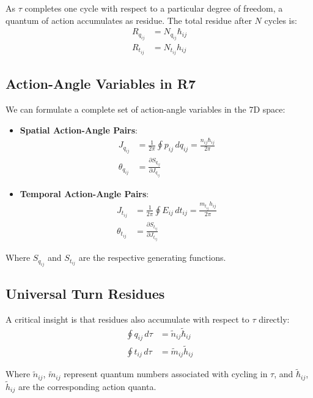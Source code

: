 \documentclass{article}
\begin{document}
As $\tau$ completes one cycle with respect to a particular degree of freedom, a quantum of action accumulates as residue. The total residue after $N$ cycles is:
\begin{align}
R_{q_{ij}} &= N_{q_{ij}} \hbar_{ij} \\
R_{t_{ij}} &= N_{t_{ij}} h_{ij}
\end{align}

\subsection{Action-Angle Variables in R7}

We can formulate a complete set of action-angle variables in the 7D space:

\begin{itemize}
\item \textbf{Spatial Action-Angle Pairs}:
\begin{align}
J_{q_{ij}} &= \frac{1}{2\pi}\oint p_{ij} \, dq_{ij} = \frac{n_{ij}\hbar_{ij}}{2\pi} \\
\theta_{q_{ij}} &= \frac{\partial S_{q_{ij}}}{\partial J_{q_{ij}}}
\end{align}

\item \textbf{Temporal Action-Angle Pairs}:
\begin{align}
J_{t_{ij}} &= \frac{1}{2\pi}\oint E_{ij} \, dt_{ij} = \frac{m_{t_{ij}}h_{ij}}{2\pi} \\
\theta_{t_{ij}} &= \frac{\partial S_{t_{ij}}}{\partial J_{t_{ij}}}
\end{align}
\end{itemize}

Where $S_{q_{ij}}$ and $S_{t_{ij}}$ are the respective generating functions.

\subsection{Universal Turn Residues}

A critical insight is that residues also accumulate with respect to $\tau$ directly:
\begin{align}
\oint q_{ij} \, d\tau &= \tilde{n}_{ij} \tilde{\hbar}_{ij} \\
\oint t_{ij} \, d\tau &= \tilde{m}_{ij} \tilde{h}_{ij}
\end{align}

Where $\tilde{n}_{ij}$, $\tilde{m}_{ij}$ represent quantum numbers associated with cycling in $\tau$, and $\tilde{\hbar}_{ij}$, $\tilde{h}_{ij}$ are the corresponding action quanta.
\end{document}
